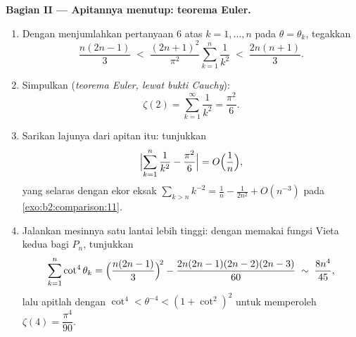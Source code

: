 \begin{problem}[{Soal akhir pekan --- $\zeta(2) = \pi^2/6$ dan
panorama Bertrand}]
\medskip
\noindent\textbf{Bagian II --- Apitannya menutup: teorema
Euler.}
\begin{enumerate}[resume]
  \item Dengan menjumlahkan pertanyaan 6 atas $k = 1, \dots, n$ pada
        $\theta = \theta_k$, tegakkan
        \[
        \frac{n(2n-1)}{3} \;<\;
        \frac{(2n+1)^2}{\pi^2}\sum_{k=1}^{n}\frac1{k^2}
        \;<\; \frac{2n(n+1)}{3}.
        \]
  \item Simpulkan (\emph{teorema Euler, lewat bukti Cauchy}):
        \[
        \zeta(2) = \sum_{k=1}^{\infty}\frac{1}{k^2} =
        \frac{\pi^2}{6}.
        \]
  \item Sarikan lajunya dari apitan itu: tunjukkan
        \[
        \Bigl|\sum_{k=1}^{n}\frac1{k^2} - \frac{\pi^2}6\Bigr|
        = O\Bigl(\frac1n\Bigr),
        \]
        yang selaras dengan ekor eksak $\sum_{k>n}k^{-2} =
        \frac1n - \frac{1}{2n^2} + O(n^{-3})$ pada
        \cref{exo:b2:comparison:11}.
  \item Jalankan mesinnya satu lantai lebih tinggi: dengan memakai
        fungsi Vieta kedua bagi $P_n$, tunjukkan
        \[
        \sum_{k=1}^{n}\cot^4\theta_k =
        \Bigl(\frac{n(2n-1)}3\Bigr)^{\!2} -
        \frac{2n(2n-1)(2n-2)(2n-3)}{60}
        \;\sim\; \frac{8n^4}{45},
        \]
        lalu apitlah dengan $\cot^4 < \theta^{-4} < (1 +
        \cot^2)^2$ untuk memperoleh $\zeta(4) = \dfrac{\pi^4}{90}$.
\end{enumerate}


\end{problem}
